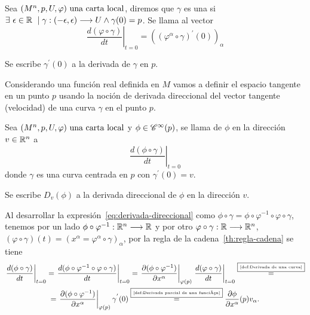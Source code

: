 \begin{definition}
  Sea $(M^n,p,U,\varphi)\textmd{ una carta local}$, diremos que $\gamma$ es una  si $\exists\ \epsilon\in\mathbb{R} \ \mid \gamma:(-\epsilon,\epsilon)\longrightarrow U\land
  \gamma(0)=p$.
  Se llama  al vector
  \begin{equation}
    \label{eq:derivada-curva}
    \left.\frac{d(\varphi\circ\gamma)
    }{dt}\right|_{t=0}=((\varphi^\alpha\circ\gamma)^{'}(0))_\alpha
  \end{equation}
\end{definition}
\begin{notation}
  Se escribe $\gamma^{'}(0)$ a la derivada de $\gamma$ en $p$.
\end{notation}

Considerando una función real definida en $M$ vamos a definir el espacio tangente en un
punto $p$ usando la noción de derivada direccional del vector tangente (velocidad) de una curva
$\gamma$ en el punto $p$.

\begin{definition}
  Sea $(M^n,p,U,\varphi)\textmd{ una carta local}$ y $\phi\in\mathscr{C}^\infty(p)$, se llama
   de $\phi$ en la dirección $v\in\mathbb{R}^n$ a
  \begin{equation}
    \label{eq:derivada-direccional}
    \left.\frac{d(\phi\circ\gamma)}{dt}\right|_{t=0}
  \end{equation}
  donde $\gamma$ es una curva centrada en $p$ con $\gamma^{'}(0)=v$.
\end{definition}
\begin{notation}
  Se escribe $D_v(\phi)$ a la derivada direccional de $\phi$ en la dirección $v$.
\end{notation}
Al desarrollar la expresión~\ref{eq:derivada-direccional} como
$\phi\circ\gamma=\phi\circ\varphi^{-1}\circ\varphi\circ\gamma$, tenemos por un lado
$\phi\circ\varphi^{-1}:\mathbb{R}^n\longrightarrow \mathbb{R}$
y por otro
$\varphi\circ\gamma:\mathbb{R}\longrightarrow \mathbb{R}^n$, $(\varphi\circ\gamma)(t)=
(x^\alpha=\varphi^\alpha\circ\gamma)_{\alpha}$,
por la regla de la cadena~\ref{th:regla-cadena} se tiene
\begin{multline}\label{eq:desarrollo-vector-tangente}
  \left.\frac{d(\phi\circ\gamma)}{dt}\right|_{t=0}=
  \left.\frac{d(\phi\circ\varphi^{-1}\circ\varphi\circ\gamma)}{dt}\right|_{t=0}=
  \left.\frac{\partial(\phi\circ\varphi^{-1})}{\partial x^\alpha}\right|_{\varphi(p)}
  \left.\frac{d(\varphi\circ\gamma)}{dt}\right|_{t=0}\overset{\fbox{\tiny \ref{def:Derivada de una curva}}}{=}\\
  =\left.\frac{\partial(\phi\circ\varphi^{-1})}{\partial x^\alpha}\right|_{\varphi(p)}
  \gamma^{'}(0)\overset{\fbox{\tiny \ref{def:Derivada parcial de una función}}}{=}
  \frac{\partial\phi}{\partial x^\alpha}(p) v_\alpha.
\end{multline}

